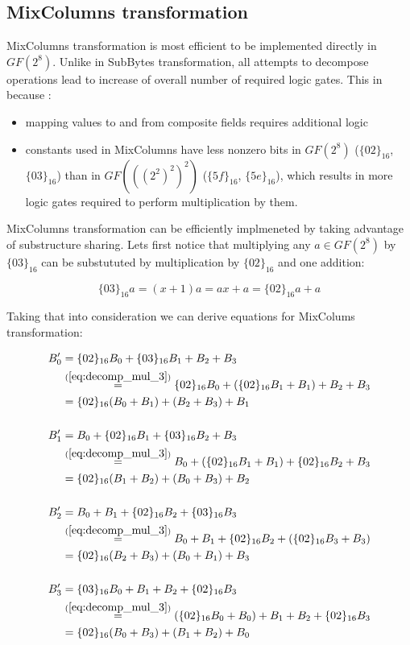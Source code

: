 \subsection{MixColumns transformation}

MixColumns transformation is most efficient to be implemented directly in $GF(2^8)$. Unlike in SubBytes transformation, all attempts to decompose operations lead to increase of overall number of required logic gates. This in because \cite{vlsi}:
\begin{itemize}[nolistsep]
\item mapping values to and from composite fields requires additional logic
\item constants used in MixColumns have less nonzero bits in $GF(2^8)$ ($\{02\}_{16}$, $\{03\}_{16}$) than in $GF(((2^2)^2)^2)$ ($\{5f\}_{16}$, $\{5e\}_{16}$), which results in more logic gates required to perform multiplication by them.
\end{itemize}

MixColumns transformation can be efficiently implmeneted by taking advantage of substructure sharing. Lets first notice that multiplying any $a \in GF(2^8)$ by $\{03\}_{16}$ can be substututed by multiplication by $\{02\}_{16}$ and one addition:

\begin{equation}
\label{eq:decomp_mul_3}
\{03\}_{16}a = (x + 1)a = ax + a = \{02\}_{16}a + a
\end{equation}

Taking that into consideration we can derive equations for MixColums transformation:

\begin{equation}
\label{xd}
\begin{aligned}
B_0' &= \{02\}_{16}B_0 + \{03\}_{16}B_1 + B_2 + B_3 \\
&\stackrel{(\ref{eq:decomp_mul_3})}{=}
\{02\}_{16}B_0 + (\{02\}_{16}B_1 + B_1) + B_2 + B_3 \\
&= \{02\}_{16}(B_0 + B_1) + (B_2 + B_3) + B_1 \\ \\
%
B_1' &= B_0 + \{02\}_{16}B_1 + \{03\}_{16}B_2 +  B_3 \\ 
&\stackrel{(\ref{eq:decomp_mul_3})}{=}
B_0 + (\{02\}_{16}B_1 + B_1) + \{02\}_{16}B_2 + B_3 \\ 
&= \{02\}_{16}(B_1 + B_2) + (B_0 + B_3) + B_2\\ \\
%
B_2' &= B_0 + B_1 + \{02\}_{16}B_2 + \{03\}_{16}B_3 \\
&\stackrel{(\ref{eq:decomp_mul_3})}{=}
B_0 + B_1 + \{02\}_{16}B_2 + (\{02\}_{16}B_3 + B_3) \\
&= \{02\}_{16}(B_2 + B_3) + (B_0 + B_1) + B_3 \\ \\
%
B_3' &= \{03\}_{16}B_0 + B_1 + B_2 + \{02\}_{16}B_3 \\
&\stackrel{(\ref{eq:decomp_mul_3})}{=}
(\{02\}_{16}B_0 + B_0) + B_1 + B_2 + \{02\}_{16}B_3 \\
&= \{02\}_{16}(B_0 + B_3) + (B_1 + B_2) + B_0
\end{aligned}
\end{equation}

